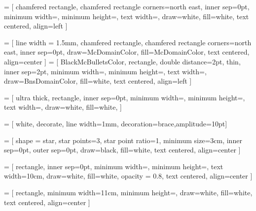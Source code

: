 \documentclass[tikz, table]{standalone}
\begin{document}
 = [
chamfered rectangle,
chamfered rectangle corners=north east,
inner sep=0pt,
minimum width=\MinNodeWidth,
minimum height=\MinNodeHigth,
text width=\NodeTextWidth,
draw=white, 
fill=white,
text centered, 
align=left
]

 = [
line width = 1.5mm,
chamfered rectangle,
chamfered rectangle corners=north east,
inner sep=0pt,
draw=McDomainColor, 
fill=McDomainColor,
text centered, 
align=center
]
 = [
BlackMcBulletsColor,
rectangle, 
double distance=2pt,
thin,
inner sep=2pt,
minimum width=\MinNodeWidth,
minimum height=\MinNodeHigth,
text width=\NodeTextWidth,
draw=BnsDomainColor, 
fill=white,
text centered, 
align=left
]

 = [
ultra thick,
rectangle, 
inner sep=0pt,
minimum width=\MinNodeWidth,
minimum height=\MinNodeHigth,
text width=\NodeTextWidth,
draw=white, 
fill=white,
]

 = [
white,
decorate, 
line width=1mm, 
decoration={brace,amplitude=10pt}]

 = [
shape = star, 
star points=3, 
star point ratio=1, 
minimum size=3cm,
inner sep=0pt,
outer sep=0pt,
draw=black, 
fill=white,
text centered, 
align=center
]

 = [
rectangle, 
inner sep=0pt,
minimum width=\MinNodeWidth,
minimum height=\MinNodeHigth,
text width=10cm,
draw=white, 
fill=white,
opacity = 0.8,
text centered, 
align=center
]

 = [
rectangle, 
minimum width=11cm,
minimum height=\MinNodeHigth,
draw=white, 
fill=white,
text centered, 
align=center
]
\end{document}
